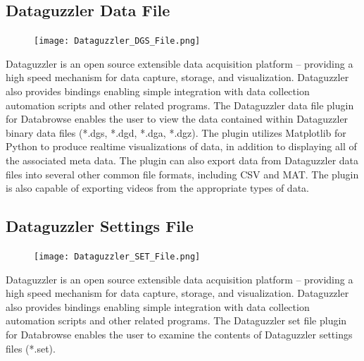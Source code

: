 \documentclass[10pt]{article}
\begin{document}
\subsection{Dataguzzler Data File}
\begin{figure}
		\texttt{[image: Dataguzzler\_DGS\_File.png]}
\end{figure}
Dataguzzler is an open source extensible data acquisition platform -- providing a high speed mechanism for data capture, storage, and visualization.  Dataguzzler also provides bindings enabling simple integration with data collection automation scripts and other related programs.  The Dataguzzler data file plugin for Databrowse enables the user to view the data contained within Dataguzzler binary data files (*.dgs, *.dgd, *.dga, *.dgz).  The plugin utilizes Matplotlib for Python to produce realtime visualizations of data, in addition to displaying all of the associated meta data.  The plugin can also export data from Dataguzzler data files into several other common file formats, including CSV and MAT.  The plugin is also capable of exporting videos from the appropriate types of data.

\endgroup


\clearpage
\begingroup
\setlength\intextsep{0pt}
\subsection{Dataguzzler Settings File}
\begin{figure}
		\texttt{[image: Dataguzzler\_SET\_File.png]}
\end{figure}
Dataguzzler is an open source extensible data acquisition platform -- providing a high speed mechanism for data capture, storage, and visualization.  Dataguzzler also provides bindings enabling simple integration with data collection automation scripts and other related programs.  The Dataguzzler set file plugin for Databrowse enables the user to examine the contents of Dataguzzler settings files (*.set).

\endgroup

\hfill \break
\hfill \break
\hfill \break
\hfill \break
\hfill \break
\hfill \break
\hfill \break
\hfill \break

\begingroup
\setlength\intextsep{0pt}
\end{document}
